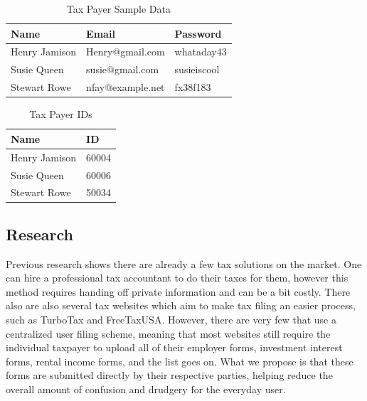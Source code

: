 \documentclass[sigconf]{acmart}
\begin{document}
\begin{table}[H]
\begin{center}
  \caption{Tax Payer Sample Data}
\begin{tabularx}{0.45\textwidth} { | m{2cm} | m{3cm} | m{1.9cm} | }
 \hline
 Name & Email & Password \\
 \hline
 \hline
 Henry Jamison & Henry@gmail.com & whataday43\\
 \hline
 Susie Queen & susie@gmail.com & susieiscool\\
 \hline
 Stewart Rowe & nfay@example.net & fx38f183\\
\end{tabularx}
\end{center}
\end{table}

\begin{table}[H]
\begin{center}
  \caption{Tax Payer IDs}
\begin{tabularx}{0.45\textwidth} { | m{4cm} | m{3.25cm} | }
 \hline
 Name & ID \\
 \hline
 \hline
 Henry Jamison & 60004\\
 \hline
 Susie Queen & 60006\\
 \hline
 Stewart Rowe & 50034\\
\end{tabularx}
\end{center}
\end{table}

\subsection{Research}
Previous research shows there are already a few tax solutions on the market. One can hire a professional tax accountant to do their taxes for them, however this method requires handing off private information and can be a bit costly. There also are also several tax websites which aim to make tax filing an easier process, such as TurboTax and FreeTaxUSA. However, there are very few that use a centralized user filing scheme, meaning that most websites still require the individual taxpayer to upload all of their employer forms, investment interest forms, rental income forms, and the list goes on. What we propose is that these forms are submitted directly by their respective parties, helping reduce the overall amount of confusion and drudgery for the everyday user.
\end{document}
